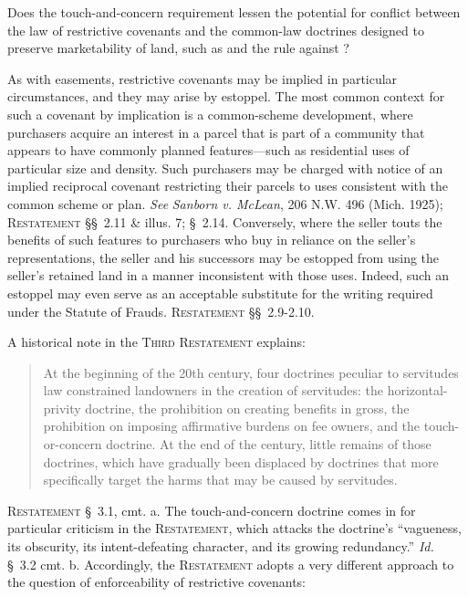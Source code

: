 
\item Does the touch-and-concern requirement lessen the potential for conflict
between the law of restrictive covenants and the common-law doctrines designed
to preserve marketability of land, such as \textit{}
and the rule
against ?


\item As with easements, restrictive covenants may be implied in particular
circumstances, and they may arise by estoppel. The most common context for such
a covenant by implication is a common-scheme development, where purchasers
acquire an interest in a parcel that is part of a community that appears to have
commonly planned features---such as residential uses of particular size and
density. Such purchasers may be charged with notice of an implied reciprocal
covenant restricting their parcels to uses consistent with the common scheme or
plan. \textit{See} \emph{Sanborn v. McLean}, 206 N.W. 496 (Mich. 1925);
\textsc{Restatement} \S\S~2.11 \& illus. 7; \S~2.14. Conversely, where the
seller touts
the benefits of such features to purchasers who buy in reliance on the seller's
representations, the seller and his successors may be estopped from using the
seller's retained land in a manner inconsistent with those uses. Indeed, such an
estoppel may even serve as an acceptable substitute for the writing required
under the Statute of Frauds. \textsc{Restatement} \S\S~2.9-2.10.

\item A historical note in the \textsc{Third Restatement} explains: 
\begin{quote}
At the beginning of the 20th century, four doctrines peculiar to servitudes law
constrained landowners in the creation of servitudes: the horizontal-privity
doctrine, the prohibition on creating benefits in gross, the prohibition on
imposing affirmative burdens on fee owners, and the touch-or-concern doctrine.
At the end of the century, little remains of those doctrines, which have
gradually been displaced by doctrines that more specifically target the harms
that may be caused by servitudes. 
\end{quote}
\textsc{Restatement} \S~3.1, cmt. a. The touch-and-concern doctrine comes in for
particular criticism in the \textsc{Restatement}, which attacks the doctrine's
``vagueness, its obscurity, its intent-defeating character, and its growing
redundancy.'' \textit{Id.} \S~3.2 cmt. b. Accordingly, the \textsc{Restatement}
adopts a
very different approach to the question of enforceability of restrictive
covenants:

